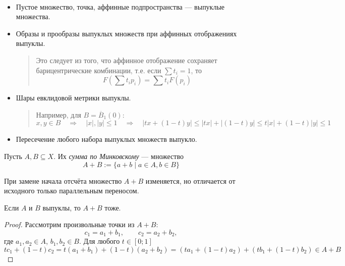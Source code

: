 \documentclass[12pt,a4paper]{article}
\begin{document}
    \begin{example}\ 
        \begin{itemize}
            \item Пустое множество, точка, аффинные подпространства --- выпуклые множества.
            \item Образы и прообразы выпуклых множеств при аффинных отображениях выпуклы.
                \begin{quotation}
                    Это следует из того, что аффинное отображение сохраняет барицентрические комбинации, т.е. если $\sum t_i = 1$, то
                    \[F\left(\sum t_i p_i\right) = \sum t_i F(p_i)\]
                \end{quotation}
            \item Шары евклидовой метрики выпуклы.
                \begin{quotation}
                    Например, для $B = \overline{B}_1(0)$:
                    \[
                        x, y \in B
                        \quad \Longrightarrow \quad |x|, |y| \leqslant 1
                        \quad \Longrightarrow \quad |tx + (1-t)y| \leqslant |tx| + |(1-t)y| \leqslant t|x| + (1-t)|y| \leqslant 1
                    \]
                \end{quotation}
            \item Пересечение любого набора выпуклых множеств выпукло.
        \end{itemize}
    \end{example}

    \begin{definition}
        Пусть $A, B \subseteq X$. Их \emph{сумма по Минковскому} --- множество
        \[A + B := \{a + b \mid a \in A, b \in B\}\]
    \end{definition}

    \begin{remark}
        При замене начала отсчёта множество $A + B$ изменяется, но отличается от исходного только параллельным переносом.
    \end{remark}

    \begin{theorem}
        Если $A$ и $B$ выпуклы, то $A + B$ тоже.
    \end{theorem}

    \begin{proof}
        Рассмотрим произвольные точки из $A + B$:
        \[c_1 = a_1 + b_1, \qquad c_2 = a_2 + b_2,\]
        где $a_1, a_2 \in A$, $b_1, b_2 \in B$. Для любого $t \in [0;1]$
        \[
            tc_1 + (1-t)c_2
            = t(a_1 + b_1) + (1-t)(a_2 + b_2)
            = (ta_1 + (1-t)a_2) + (tb_1 + (1-t)b_2)
            \in A + B
        \]
    \end{proof}
\end{document}
